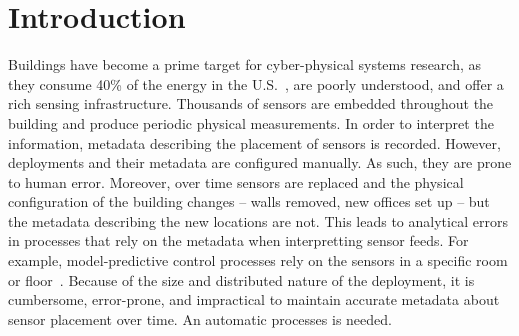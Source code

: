 \section{Introduction}
\label{sec:intro}





Buildings have become a prime target for cyber-physical systems research, as they consume 40\% of
the energy in the U.S.~\cite{EIA}, are poorly understood,
and offer a rich sensing infrastructure.  Thousands of sensors are embedded throughout 
the building and produce periodic physical measurements. In order to interpret the information, metadata describing 
the placement of sensors is recorded.
However, deployments and their metadata are configured manually.  As such, they are prone to human error.
Moreover, over time sensors are replaced and the physical configuration of the building changes -- walls removed,
new offices set up -- but the metadata describing the new locations are not.  This leads to analytical errors in processes 
that rely on the metadata when interpretting sensor feeds.  For example, model-predictive control processes rely
on the sensors in a specific room or floor~\cite{MPC}.  Because of the size and distributed nature of the deployment, 
it is cumbersome, error-prone, and impractical to maintain accurate metadata about sensor placement over time.  An
automatic processes is needed.

